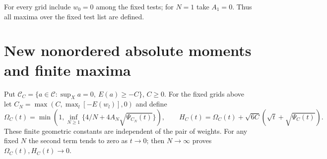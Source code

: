 \documentclass[11pt]{article}
\newcommand{\C}{\mathcal C}
\theoremstyle{remark}\newtheorem{remark}[theorem]{Remark}
\begin{document}
For every grid include $w_0=0$ among the fixed tests; for $N=1$
take $A_1=0$. Thus all maxima over the fixed test list are defined.

\section{New nonordered absolute moments and finite maxima}
Put $\C_C=\{a\in\C:\sup_Xa=0,\ E(a)\ge-C\}$, $C\ge0$.
For the fixed grids above let
$C_N=\max(C,\max_l[-E(w_l)],0)$ and define
\[
 \Omega_C(t)=\min\left(1,\inf_{N\ge1}
       \{4/N+4A_N\sqrt{\Psi_{C_N}(t)}\}\right),\qquad
 H_C(t)=\Omega_C(t)+\sqrt{6C}
       \left(\sqrt t+\sqrt{\Psi_C(t)}\right).
\]
These finite geometric constants are independent of the pair of
weights. For any fixed $N$ the second term tends to zero as $t\to0$;
then $N\to\infty$ proves $\Omega_C(t),H_C(t)\to0$.
\end{document}
